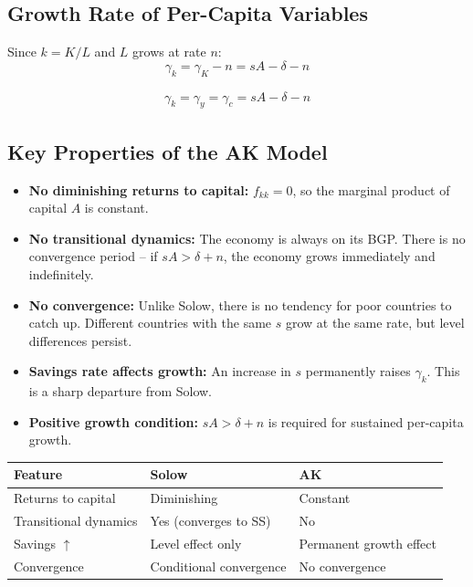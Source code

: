 \documentclass[a4paper,11pt]{article}
\begin{document}
\subsection*{Growth Rate of Per-Capita Variables}

Since $k = K/L$ and $L$ grows at rate $n$:
\[
\gamma_k = \gamma_K - n = sA - \delta - n
\]

\begin{resultbox}
\begin{align*}
\boxed{\gamma_k = \gamma_y = \gamma_c = sA - \delta - n}
\tag{AK Growth}
\end{align*}
\end{resultbox}

\subsection*{Key Properties of the AK Model}

\begin{itemize}
    \item \textbf{No diminishing returns to capital:} $f_{kk} = 0$, so the marginal product of capital $A$ is constant.
    \item \textbf{No transitional dynamics:} The economy is always on its BGP. There is no convergence period -- if $sA > \delta + n$, the economy grows immediately and indefinitely.
    \item \textbf{No convergence:} Unlike Solow, there is no tendency for poor countries to catch up. Different countries with the same $s$ grow at the same rate, but level differences persist.
    \item \textbf{Savings rate affects growth:} An increase in $s$ permanently raises $\gamma_k$. This is a sharp departure from Solow.
    \item \textbf{Positive growth condition:} $sA > \delta + n$ is required for sustained per-capita growth.
\end{itemize}

\begin{tcolorbox}[colback=orange!10,colframe=orange3,title=AK vs.\ Solow Contrast]
\begin{tabular}{lll}
\toprule
Feature & Solow & AK \\
\midrule
Returns to capital & Diminishing & Constant \\
Transitional dynamics & Yes (converges to SS) & No \\
Savings $\uparrow$ & Level effect only & Permanent growth effect \\
Convergence & Conditional convergence & No convergence \\
\bottomrule
\end{tabular}
\end{tcolorbox}
\end{document}
